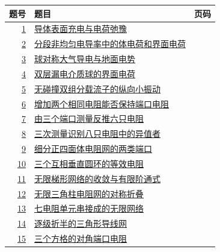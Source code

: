 \documentclass[UTF8,fontset=fandol,a4paper,11pt]{ctexart}
\begin{document}
\begin{longtable}{@{}r p{113mm} r@{}}\toprule 题号 & 题目 & 页码\\\midrule

\hyperref[q:1]{1} & \hyperref[q:1]{导体表面充电与电荷弛豫} & \pageref{q:1} \\

\hyperref[q:2]{2} & \hyperref[q:2]{分段非均匀电导率中的体电荷和界面电荷} & \pageref{q:2} \\

\hyperref[q:3]{3} & \hyperref[q:3]{球对称大气导电与地面电势} & \pageref{q:3} \\

\hyperref[q:4]{4} & \hyperref[q:4]{双层漏电介质球的界面电荷} & \pageref{q:4} \\

\hyperref[q:5]{5} & \hyperref[q:5]{无碰撞双组分载流子的纵向小振动} & \pageref{q:5} \\

\hyperref[q:6]{6} & \hyperref[q:6]{增加两个相同电阻能否保持端口电阻} & \pageref{q:6} \\

\hyperref[q:7]{7} & \hyperref[q:7]{由三个端口测量反推六只电阻} & \pageref{q:7} \\

\hyperref[q:8]{8} & \hyperref[q:8]{三次测量识别八只电阻中的异值者} & \pageref{q:8} \\

\hyperref[q:9]{9} & \hyperref[q:9]{细分正四面体电阻网的两类端口} & \pageref{q:9} \\

\hyperref[q:10]{10} & \hyperref[q:10]{三个互相垂直圆环的等效电阻} & \pageref{q:10} \\

\hyperref[q:11]{11} & \hyperref[q:11]{无限梯形网络的收敛与有限阶通式} & \pageref{q:11} \\

\hyperref[q:12]{12} & \hyperref[q:12]{无限三角柱电阻网的对称折叠} & \pageref{q:12} \\

\hyperref[q:13]{13} & \hyperref[q:13]{七电阻单元串接成的无限网络} & \pageref{q:13} \\

\hyperref[q:14]{14} & \hyperref[q:14]{逐级折半的三角形导线网} & \pageref{q:14} \\

\hyperref[q:15]{15} & \hyperref[q:15]{三个方格的对角端口电阻} & \pageref{q:15} \\


\end{longtable}
\end{document}

